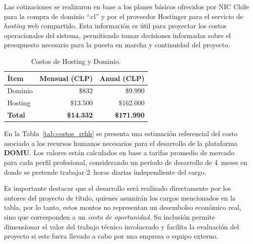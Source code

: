 {Las cotizaciones se realizaron en base a los planes básicos ofrecidos por NIC Chile para la compra de dominio “.cl” y por el proveedor Hostinger para el servicio de \textit{hosting} web compartido. Esta información es útil para proyectar los costos operacionales del sistema, permitiendo tomar decisiones informadas sobre el presupuesto necesario para la puesta en marcha y continuidad del proyecto.


\begin{table}[H]

    \centering
    
    \caption{Costos de Hosting y Dominio.}
    
    \label{tab:costos_servicios}
    
    \begin{tabular}{|l|r|r|}
    
    \hline
    \textbf{Ítem} & \textbf{Mensual (CLP)} & \textbf{Anual (CLP)}\\
    \hline
    
    Dominio & \$832 & \$9.990\\
    Hosting & \$13.500 & \$162.000\\
    \hline
    \textbf{Total} & \textbf{\$14.332} & \textbf{\$171.990}\\
    \hline
    
    \end{tabular}
\end{table}

En la Tabla~\ref{tab:costos_rrhh} se presenta una estimación referencial del costo asociado a los recursos humanos necesarios para el desarrollo de la plataforma \textbf{DOMU}. Los valores están calculados en base a tarifas promedio de mercado para cada perfil profesional, considerando un período de desarrollo de 4~meses en donde se pretende trabajar 2~horas diarias independiente del cargo.

Es importante destacar que el desarrollo será realizado directamente por los autores del proyecto de título, quienes asumirán los cargos mencionados en la tabla, por lo tanto, estos montos no representan un desembolso económico real, sino que corresponden a un \textit{costo de oportunidad}. Su inclusión permite dimensionar el valor del trabajo técnico involucrado y facilita la evaluación del proyecto si este fuera llevado a cabo por una empresa o equipo externo.


}

